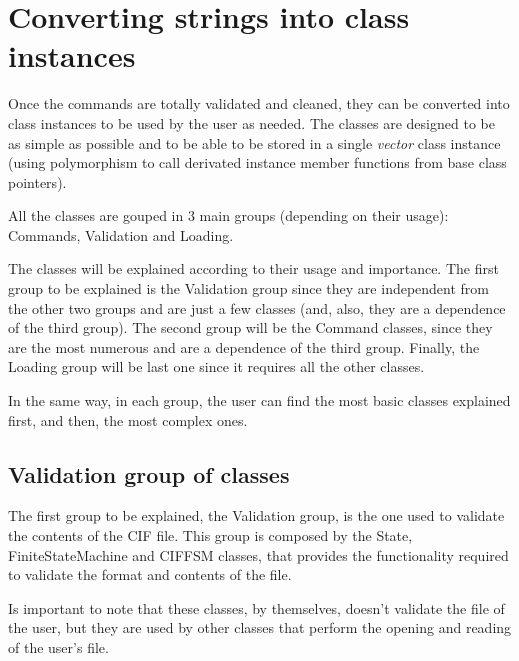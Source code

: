 \documentclass[11pt,twoside,openany,x11names,svgnames]{memoir}
\begin{document}
\section{Converting strings into class instances}\label{Converting-strings-into-class-instances}

Once the commands are totally validated and cleaned, they can be converted into class instances to be used by the user as needed. The classes are designed to be as simple as possible and to be able to be stored in a single \textit{vector} class instance (using polymorphism to call derivated instance member functions from base class pointers).

All the classes are gouped in 3 main groups (depending on their usage): Commands, Validation and Loading.

The classes will be explained according to their usage and importance. The first group to be explained is the Validation group since they are independent from the other two groups and are just a few classes (and, also, they are a dependence of the third group). The second group will be the Command classes, since they are the most numerous and are a dependence of the third group. Finally, the Loading group will be last one since it requires all the other classes.

In the same way, in each group, the user can find the most basic classes explained first, and then, the most complex ones.

\subsection{Validation group of classes}\label{Validation-group-of-classes}

The first group to be explained, the Validation group, is the one used to validate the contents of the CIF file. This group is composed by the State, FiniteStateMachine and CIFFSM classes, that provides the functionality required to validate the format and contents of the file.

Is important to note that these classes, by themselves, doesn't validate the file of the user, but they are used by other classes that perform the opening and reading of the user's file.

\newpage 
\end{document}
